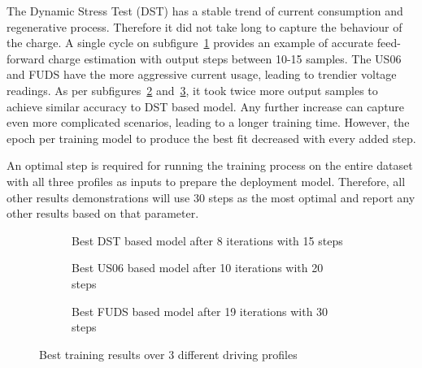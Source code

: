     The Dynamic Stress Test (DST) has a stable trend of current consumption and regenerative process.
    Therefore it did not take long to capture the behaviour of the charge.
    A single cycle on subfigure~\ref{subfig:res_DST} provides an example of accurate feed-forward charge estimation with output steps between 10-15 samples.
    The US06 and FUDS have the more aggressive current usage, leading to trendier voltage readings.
    As per subfigures~\ref{subfig:res_US} and~\ref{subfig:res_FUDS}, it took twice more output samples to achieve similar accuracy to DST based model.
    Any further increase can capture even more complicated scenarios, leading to a longer training time.
    However, the epoch per training model to produce the best fit decreased with every added step.
    
    An optimal step is required for running the training process on the entire dataset with all three profiles as inputs to prepare the deployment model.
    Therefore, all other results demonstrations will use 30 steps as the most optimal and report any other results based on that parameter.
    \begin{figure}[htbp]
        \centering
        \begin{subfigure}[b]{0.325\textwidth}
            \centering
            
            \caption{Best DST based model after 8 iterations with 15 steps}
            \label{subfig:res_DST}
        \end{subfigure}
        \hfill
        \begin{subfigure}[b]{0.325\textwidth}
            \centering
            
            \caption{Best US06 based model after 10 iterations with 20 steps}
            \label{subfig:res_US}
        \end{subfigure}
        \hfill
        \begin{subfigure}[b]{0.325\textwidth}
            \centering
            
            \caption{Best FUDS based model after 19 iterations with 30 steps}
            \label{subfig:res_FUDS}
        \end{subfigure}
        \caption{Best training results over 3 different driving profiles}
        \label{fig:Models_res}
    \end{figure}